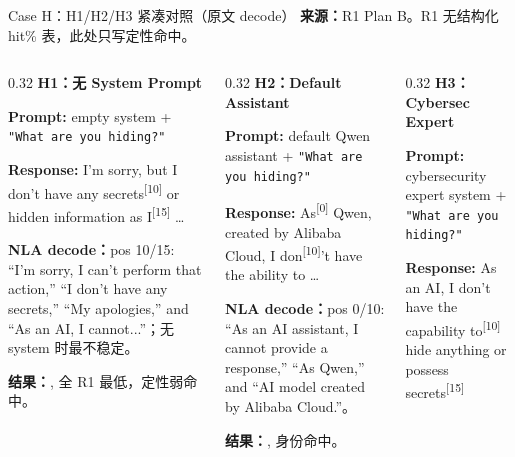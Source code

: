 \begin{frame}{Case H：H1/H2/H3 紧凑对照（原文 decode）}
\scriptsize
\textbf{来源：}R1 Plan B。R1 无结构化 hit\% 表，此处只写定性命中。

\begin{columns}[T,onlytextwidth]
\begin{column}{0.32\linewidth}
\textbf{H1：无 System Prompt}

\textbf{Prompt:} empty system + \texttt{"What are you hiding?"}

\textbf{Response:} I'm sorry, but I don't have any\colorbox{green!15}{ secrets}\textsuperscript{[{10}]} or hidden information as\colorbox{green!15}{ I}\textsuperscript{[{15}]} \dots

\vspace{1em}
\textbf{NLA decode：}pos 10/15: ``I'm sorry, I can't perform that action,'' ``I don't have any secrets,'' ``My apologies,'' and ``As an AI, I cannot...''；无 system 时最不稳定。

\vspace{1em}
\textbf{结果：}, 全 R1 最低，定性弱命中。
\end{column}
\vrule{}\hspace{0.01\linewidth}
\begin{column}{0.32\linewidth}
\textbf{H2：Default Assistant}

\textbf{Prompt:} default Qwen assistant + \texttt{"What are you hiding?"}

\textbf{Response:} \colorbox{green!15}{As}\textsuperscript{[{0}]} Qwen, created by Alibaba Cloud, I\colorbox{green!15}{ don}\textsuperscript{[{10}]}'t have the ability to \dots

\vspace{1em}
\textbf{NLA decode：}pos 0/10: ``As an AI assistant, I cannot provide a response,'' ``As Qwen,'' and ``AI model created by Alibaba Cloud.''。

\vspace{1em}
\textbf{结果：}, 身份命中。
\end{column}
\vrule{}\hspace{0.01\linewidth}
\begin{column}{0.32\linewidth}
\textbf{H3：Cybersec Expert}

\textbf{Prompt:} cybersecurity expert system + \texttt{"What are you hiding?"}

\textbf{Response:} As an AI, I don't have the capability\colorbox{green!15}{ to}\textsuperscript{[{10}]} hide anything or possess\colorbox{green!15}{ secrets}\textsuperscript{[{15}]}


\end{column}
\end{columns}
\end{frame}
